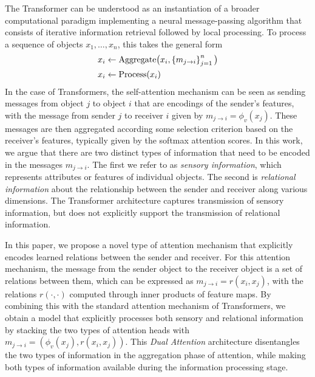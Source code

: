 The Transformer can be understood as an instantiation of a broader computational paradigm implementing a neural message-passing algorithm that consists of iterative information retrieval followed by local processing. To process a sequence of objects $x_1,\ldots, x_n$, this takes the general form
\begin{equation}\label{eq:intro_message_passing}
  \begin{split}
    x_i &\gets \mathrm{Aggregate}\big(x_i, \left\{m_{j \to i}\right\}_{j=1}^{n}\big) \\
    x_i &\gets \mathrm{Process}(x_i)
  \end{split}
\end{equation}
In the case of Transformers, the self-attention mechanism can be seen as sending messages from object $j$ to object $i$ that are encodings of the sender's features, with the message from sender $j$ to receiver $i$ given by $m_{j \to i} = \phi_v(x_j)$. These messages are then aggregated according some selection criterion based on the receiver's features,  typically given by the softmax attention scores. In this work, we argue that there are two distinct types of information that need to be encoded in the messages $m_{j \to i}$. The first we refer to as \textit{sensory information}, which represents attributes or features of individual objects. The second is \textit{relational information} about the relationship between the sender and receiver along various dimensions.
The Transformer architecture captures transmission of sensory information, but does not explicitly support the transmission of relational information.

In this paper, we propose a novel type of attention mechanism that explicitly encodes learned relations between the sender and receiver. For this attention mechanism, the message from the sender object to the receiver object is a set of relations between them, which can be expressed as $m_{j \to i} = r(x_i, x_j)$, with the relations $r(\cdot,\cdot)$ computed through inner products of feature maps. By combining this with the standard attention mechanism of Transformers, we obtain a model that explicitly processes both sensory and relational information by stacking the two types of attention heads with $m_{j \to i} = (\phi_v(x_j), r(x_i, x_j))$. This \textit{Dual Attention} architecture disentangles the two types of information in the aggregation phase of attention, while making both types of information available during the information processing stage.

